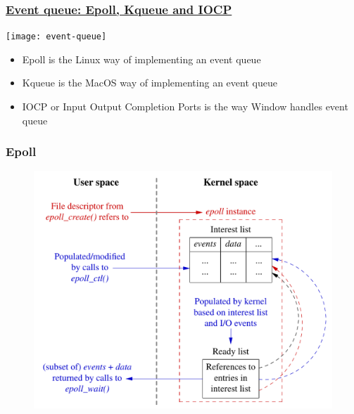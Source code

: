 \begin{frame}[fragile]
    \frametitle{\href{https://cfsamson.github.io/book-exploring-async-basics/6_epoll_kqueue_iocp.html\#epoll}{Event queue: Epoll, Kqueue and IOCP}}
% 
% 
% 
    \centering
	\texttt{[image: event-queue]}
    \begin{itemize}
    	    \item Epoll is the Linux way of implementing an event queue
    	    \item Kqueue is the MacOS way of implementing an event queue
    	    \item IOCP or Input Output Completion Ports is the way Window handles event queue
    \end{itemize}

\end{frame}
\begin{frame}[fragile]
    \frametitle{Epoll}
% 
% 
    \begin{figure}
    \includegraphics[width=0.55\linewidth]{figs/epoll.png}
    \end{figure}
% 
\end{frame}
